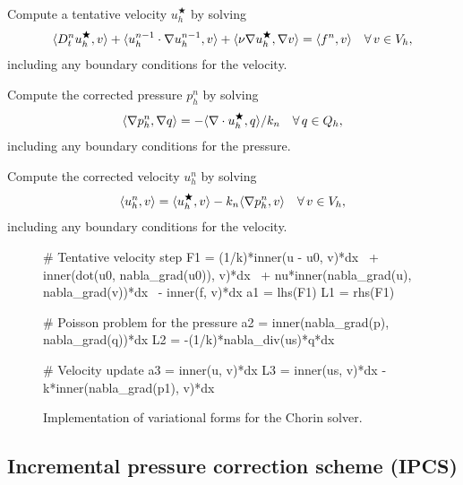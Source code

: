 {
\item
  Compute a tentative velocity $u_h^\bigstar$ by solving
  \begin{equation}\label{eq:chorin,1}
    \renni{v}{D_t^n u_h^\bigstar}
    + \renni{v}{u_h^{n-1} \cdot \nabla u_h^{n-1}}
    + \renni{\nabla v}{\nu \nabla u_h^{\bigstar}}
    = \renni{v}{f^n} \quad \foralls v \in V_h,
  \end{equation}
  including any boundary conditions for the velocity.

\item
  Compute the corrected pressure $p_h^n$ by solving
  \begin{equation}\label{eq:chorin,2}
    \renni{\nabla q}{\nabla p_h^n}
    = -\renni{q}{\nabla \cdot u_h^{\bigstar}} / k_n \quad \foralls q \in Q_h,
  \end{equation}
  including any boundary conditions for the pressure.

\item
  Compute the corrected velocity $u_h^n$ by solving
  \begin{equation}\label{eq:chorin,3}
    \renni{v}{u_h^n} = \renni{v}{u_h^{\bigstar}} - k_n \renni{v}{\nabla p_h^n}
    \quad \foralls v \in V_h,
  \end{equation}
  including any boundary conditions for the velocity.
}

\begin{figure}
\bwfig
    \begin{python}
# Tentative velocity step
F1 = (1/k)*inner(u - u0, v)*dx \
   + inner(dot(u0, nabla_grad(u0)), v)*dx \
   + nu*inner(nabla_grad(u), nabla_grad(v))*dx \
   - inner(f, v)*dx
a1 = lhs(F1)
L1 = rhs(F1)

# Poisson problem for the pressure
a2 = inner(nabla_grad(p), nabla_grad(q))*dx
L2 = -(1/k)*nabla_div(us)*q*dx

# Velocity update
a3 = inner(u, v)*dx
L3 = inner(us, v)*dx - k*inner(nabla_grad(p1), v)*dx
    \end{python}
    \caption{Implementation of variational forms for the Chorin solver.}
    \label{fig:chorin_code}
\end{figure}

\subsection{Incremental pressure correction scheme (IPCS)}
\label{sec:ipcs}
\index{IPCS}

